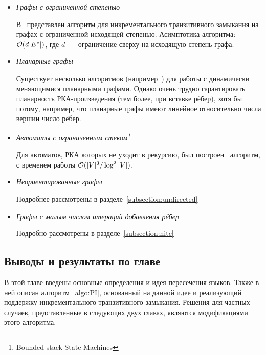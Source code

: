 \begin{itemize}
  \item \textit{Графы с ограниченной степенью}

    В~\cite{Yellin1993} представлен алгоритм для инкрементального транзитивного замыкания на графах с ограниченной исходящей степенью. Асимптотика алгоритма: $\mathcal{O}(d |E^{*}|)$, где $d$~--- ограничение сверху на исходящую степень графа.

  \item \textit{Планарные графы}

    Существует несколько алгоритмов (например~\cite{Karczmarz18}) для работы с динамически меняющимися планарными графами. Однако очень трудно гарантировать планарность РКА-произведения (тем более, при вставке рёбер), хотя бы потому, например, что планарные графы имеют линейное относительно числа вершин число рёбер.
  
  \item \textit{Автоматы с ограниченным стеком\footnote{Bounded-stack State Machines}~\cite{Chaudhuri08}}

    Для автоматов, РКА которых не уходит в рекурсию, был построен~\cite{Chaudhuri08} алгоритм, с временем работы $\mathcal{O}(|V|^3 / \log^2 |V|)$.

  \item \textit{Неориентированные графы}

    Подробнее рассмотрены в разделе~\ref{subsection:undirected}

  \item \textit{Графы с малым числом итераций добавления рёбер}
    
    Подробно рассмотрены в разделе~\ref{subsection:nitc}

\end{itemize}

\subsection{Выводы и результаты по главе}

В этой главе введены основные определения и идея пересечения языков. Также в ней описан алгоритм~\ref{algo:PI}, основанный на данной идее и реализующий поддержку инкрементального транзитивного замыкания. Решения для частных случаев, представленные в следующих двух главах, являются модификациями этого алгоритма.